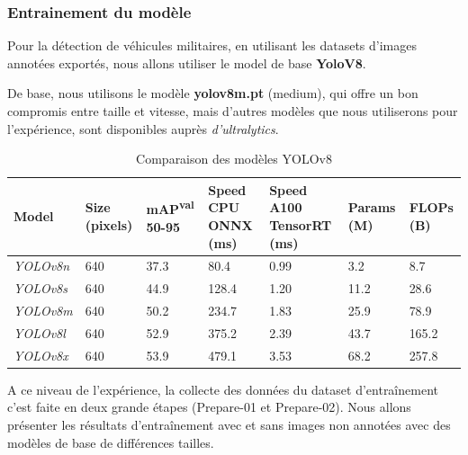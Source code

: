 \subsubsection{Entrainement du modèle}

Pour la détection de véhicules militaires, en utilisant les datasets d'images annotées exportés, nous allons utiliser le model de base \textbf{YoloV8}.

De base, nous utilisons le modèle \textbf{yolov8m.pt} (medium), qui offre un bon compromis entre taille et vitesse, mais d'autres modèles que nous utiliserons pour l'expérience, sont disponibles auprès \textit{d'ultralytics}.

\begin{table}[h]
	\centering
	\begin{tabular}{|p{2cm}|p{2cm}|p{1.7cm}|p{2.4cm}|p{2.4cm}|p{1.7cm}|p{1.7cm}|}
		\hline
		\textbf{Model}   & \textbf{Size (pixels)} & \textbf{mAP\textsuperscript{val} 50-95} & \textbf{Speed CPU ONNX (ms)} & \textbf{Speed A100 TensorRT (ms)} & \textbf{Params (M)} & \textbf{FLOPs (B)} \\ \hline
		\textit{YOLOv8n} & 640                    & 37.3                                    & 80.4                         & 0.99                              & 3.2                 & 8.7                \\ \hline
		\textit{YOLOv8s} & 640                    & 44.9                                    & 128.4                        & 1.20                              & 11.2                & 28.6               \\ \hline
		\textit{YOLOv8m} & 640                    & 50.2                                    & 234.7                        & 1.83                              & 25.9                & 78.9               \\ \hline
		\textit{YOLOv8l} & 640                    & 52.9                                    & 375.2                        & 2.39                              & 43.7                & 165.2              \\ \hline
		\textit{YOLOv8x} & 640                    & 53.9                                    & 479.1                        & 3.53                              & 68.2                & 257.8              \\ \hline
	\end{tabular}
	\caption{Comparaison des modèles YOLOv8}
	\label{tab:yolov8_comparaison}
\end{table}

A ce niveau de l'expérience, la collecte des données du dataset d'entraînement c'est faite en deux grande étapes (Prepare-01 et Prepare-02).
Nous allons présenter les résultats d'entraînement avec et sans images non annotées avec des modèles de base de différences tailles.\\


